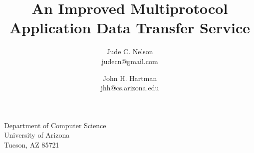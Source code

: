 \documentclass[10pt]{article}
\title{\Large An Improved Multiprotocol Application Data Transfer Service}
\author{
Jude C. Nelson\\
judecn@gmail.com
\and
John H. Hartman\\
jhh@cs.arizona.edu\\
}
\begin{document}
\maketitle

\begin{center} 
Department of Computer Science \\ 
University of Arizona \\ 
Tucson, AZ 85721 
\end{center}










\end{document}
